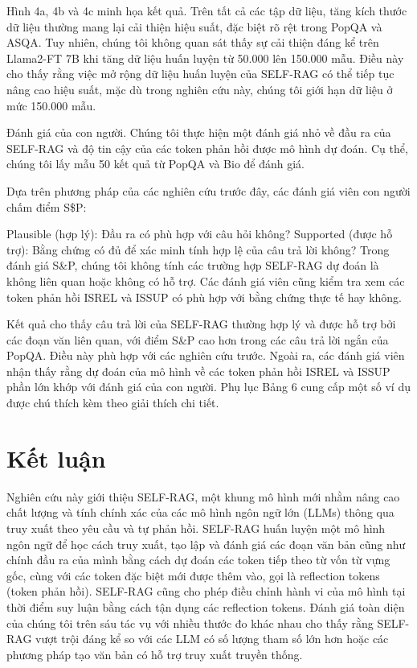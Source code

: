\documentclass{article}
\begin{document}
Hình 4a, 4b và 4c minh họa kết quả. Trên tất cả các tập dữ liệu, tăng kích thước dữ liệu thường mang lại cải thiện hiệu suất, đặc biệt rõ rệt trong PopQA và ASQA. Tuy nhiên, chúng tôi không quan sát thấy sự cải thiện đáng kể trên Llama2-FT 7B khi tăng dữ liệu huấn luyện từ 50.000 lên 150.000 mẫu. Điều này cho thấy rằng việc mở rộng dữ liệu huấn luyện của SELF-RAG có thể tiếp tục nâng cao hiệu suất, mặc dù trong nghiên cứu này, chúng tôi giới hạn dữ liệu ở mức 150.000 mẫu.

Đánh giá của con người. Chúng tôi thực hiện một đánh giá nhỏ về đầu ra của SELF-RAG và độ tin cậy của các token phản hồi được mô hình dự đoán. Cụ thể, chúng tôi lấy mẫu 50 kết quả từ PopQA và Bio để đánh giá.

Dựa trên phương pháp của các nghiên cứu trước đây, các đánh giá viên con người chấm điểm S\$P:

Plausible (hợp lý): Đầu ra có phù hợp với câu hỏi không?
Supported (được hỗ trợ): Bằng chứng có đủ để xác minh tính hợp lệ của câu trả lời không?
Trong đánh giá S\&P, chúng tôi không tính các trường hợp SELF-RAG dự đoán là không liên quan hoặc không có hỗ trợ. Các đánh giá viên cũng kiểm tra xem các token phản hồi ISREL và ISSUP có phù hợp với bằng chứng thực tế hay không.

Kết quả cho thấy câu trả lời của SELF-RAG thường hợp lý và được hỗ trợ bởi các đoạn văn liên quan, với điểm S\&P cao hơn trong các câu trả lời ngắn của PopQA. Điều này phù hợp với các nghiên cứu trước. Ngoài ra, các đánh giá viên nhận thấy rằng dự đoán của mô hình về các token phản hồi ISREL và ISSUP phần lớn khớp với đánh giá của con người. Phụ lục Bảng 6 cung cấp một số ví dụ được chú thích kèm theo giải thích chi tiết.


\section{Kết luận}
Nghiên cứu này giới thiệu SELF-RAG, một khung mô hình mới nhằm nâng cao chất lượng và tính chính xác của các mô hình ngôn ngữ lớn (LLMs) thông qua truy xuất theo yêu cầu và tự phản hồi. SELF-RAG huấn luyện một mô hình ngôn ngữ để học cách truy xuất, tạo lập và đánh giá các đoạn văn bản cũng như chính đầu ra của mình bằng cách dự đoán các token tiếp theo từ vốn từ vựng gốc, cùng với các token đặc biệt mới được thêm vào, gọi là reflection tokens (token phản hồi). SELF-RAG cũng cho phép điều chỉnh hành vi của mô hình tại thời điểm suy luận bằng cách tận dụng các reflection tokens. Đánh giá toàn diện của chúng tôi trên sáu tác vụ với nhiều thước đo khác nhau cho thấy rằng SELF-RAG vượt trội đáng kể so với các LLM có số lượng tham số lớn hơn hoặc các phương pháp tạo văn bản có hỗ trợ truy xuất truyền thống.

\printbibliography
\end{document}
